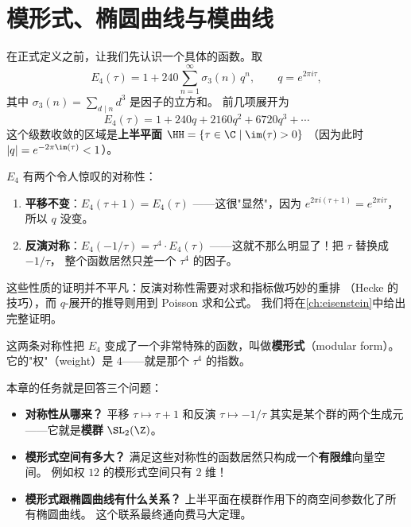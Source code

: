 \chapter{模形式、椭圆曲线与模曲线}
\label{ch:forms-curves}


在正式定义之前，让我们先认识一个具体的函数。取
\[
  E_4(\tau) = 1 + 240\sum_{n=1}^{\infty} \sigma_3(n)\, q^n,
  \qquad q = e^{2\pi i\tau},
\]
其中 $\sigma_3(n) = \sum_{d \mid n} d^3$ 是因子的立方和。
前几项展开为
\[
  E_4(\tau) = 1 + 240q + 2160q^2 + 6720q^3 + \cdots
\]
这个级数收敛的区域是\textbf{上半平面} $\HH = \{\tau \in \C \mid \im(\tau) > 0\}$
（因为此时 $|q| = e^{-2\pi \im(\tau)} < 1$）。

$E_4$ 有两个令人惊叹的对称性：
\begin{enumerate}
  \item \textbf{平移不变}：$E_4(\tau + 1) = E_4(\tau)$
    ——这很"显然"，因为 $e^{2\pi i(\tau+1)} = e^{2\pi i\tau}$，
    所以 $q$ 没变。
  \item \textbf{反演对称}：$E_4(-1/\tau) = \tau^4 \cdot E_4(\tau)$
    ——这就不那么明显了！把 $\tau$ 替换成 $-1/\tau$，
    整个函数居然只差一个 $\tau^4$ 的因子。
\end{enumerate}
这些性质的证明并不平凡：反演对称性需要对求和指标做巧妙的重排
（Hecke 的技巧），而 $q$-展开的推导则用到 Poisson 求和公式。
我们将在\cref{ch:eisenstein}中给出完整证明。

这两条对称性把 $E_4$ 变成了一个非常特殊的函数，叫做\textbf{模形式}（modular form）。
它的"权"（weight）是 $4$——就是那个 $\tau^4$ 的指数。

本章的任务就是回答三个问题：
\begin{itemize}
  \item \textbf{对称性从哪来？}
    平移 $\tau \mapsto \tau+1$ 和反演 $\tau \mapsto -1/\tau$
    其实是某个群的两个生成元——它就是\textbf{模群} $\SL_2(\Z)$。
  \item \textbf{模形式空间有多大？}
    满足这些对称性的函数居然只构成一个\textbf{有限维}向量空间。
    例如权 $12$ 的模形式空间只有 $2$ 维！
  \item \textbf{模形式跟椭圆曲线有什么关系？}
    上半平面在模群作用下的商空间参数化了所有椭圆曲线。
    这个联系最终通向费马大定理。
\end{itemize}


